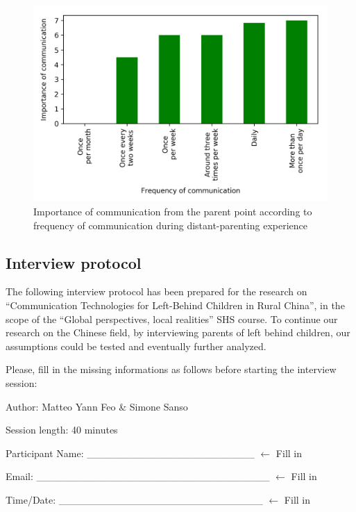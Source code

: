 \begin{figure}[h!]
    \centering
    \includegraphics[scale=0.58]{plots/plot_8.png}
    \caption{Importance of communication from the parent point according to frequency of communication during distant-parenting experience}
    \label{fig:plot_8}
\end{figure}


\subsection{Interview protocol}
\label{appendix:interview_protocol}

The following interview protocol has been prepared for the research on “Communication Technologies for Left-Behind Children in Rural China”, in the scope of the “Global perspectives, local realities” SHS course. To continue our research on the Chinese field, by interviewing parents of left behind children, our assumptions could be tested and eventually further analyzed.

\vspace{4pt}
Please, fill in the missing informations as follows before starting the interview session:

Author: Matteo Yann Feo \& Simone Sanso

Session length: 40 minutes 

Participant Name: \hfill \_\_\_\_\_\_\_\_\_\_\_\_\_\_\_\_\_\_\_\_\_\_\_  $\leftarrow$ Fill in

Email: \hfill \_\_\_\_\_\_\_\_\_\_\_\_\_\_\_\_\_\_\_\_\_\_\_\_\_\_\_\_\_\_\_\_ $\leftarrow$ Fill in

Time/Date: \hfill \_\_\_\_\_\_\_\_\_\_\_\_\_\_\_\_\_\_\_\_\_\_\_\_\_\_\_\_ $\leftarrow$ Fill in


